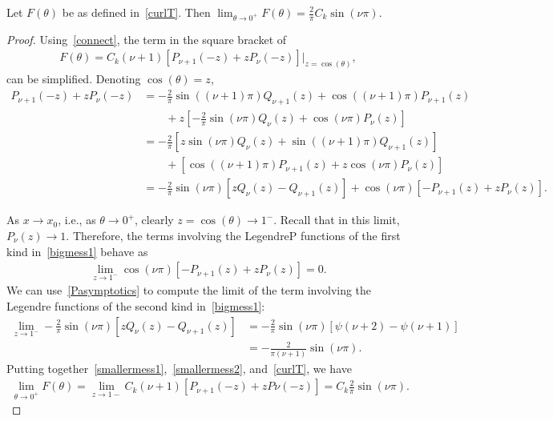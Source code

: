 \documentclass[final]{siamltex}
\newcommand{\C}{C_k}
\begin{document}
\begin{lemma} 
Let $F(\theta)$ be as defined in~\eqref{curlT}. Then
$\lim_{\theta\rightarrow 0^+} F(\theta)= \frac{2}{\pi}C_k \sin(\nu
\pi)$.
\end{lemma}
\begin{proof} 
Using~\eqref{connect}, the term in the square bracket of
\begin{align*}
F(\theta) =  \C (\nu+1)  \left[ P_{\nu+1}(-z) + 
  z P_\nu(-z)\right]\vert_{z=\cos(\theta)},
\end{align*}
can be simplified.  Denoting $\cos(\theta)=z$, 
\begin{align}
  P_{\nu+1}(-z) + z P_\nu(-z)&=-\frac{2}{\pi}\sin\left((\nu+1) \pi\right)Q_{\nu+1}(z)+
    \cos((\nu+1)\pi)P_{\nu+1}(z) \nonumber \\
  & \qquad +z\left[-\frac{2}{\pi}\sin(\nu\pi)Q_\nu\left(z\right)+
    \cos(\nu\pi)P_\nu\left(z\right)  \right] \nonumber \\
  &=-\frac{2}{\pi}\left[z\sin(\nu \pi)Q_\nu\left(z\right) + 
    \sin\left((\nu+1) \pi\right)Q_{\nu+1}\left(z\right)\right]
    \nonumber \\
  & \qquad +\left[ \cos((\nu+1)\pi)P_{\nu+1}\left(z\right) + 
    z\cos(\nu\pi)P_\nu\left(z\right) \right] \nonumber \\
  &=-\frac{2}{\pi}\sin(\nu \pi)\left[ 
    zQ_\nu\left(z\right) - Q_{\nu+1}\left(z\right)\right] 
  + \cos(\nu\pi)\left[
    -P_{\nu+1}\left(z\right)+zP_\nu\left(z\right)\right].
  \label{bigmess1}
\end{align}
 
As $x\rightarrow x_{0}$, i.e., as $\theta \rightarrow 0^{+}$, clearly
$z=\cos(\theta)\rightarrow 1^{-}$. Recall that in this limit, $P_\nu(z)
\rightarrow 1.$ Therefore, the terms involving the LegendreP functions
of the first kind in~\eqref{bigmess1} behave as 
\begin{align} 
  \label{smallermess1}
  \lim_{z \rightarrow 1^- }\cos(\nu\pi)\left[ -P_{\nu+1}(z)+ z P_\nu(z)
  \right]  = 0.
\end{align}
We can use~\eqref{Pasymptotics} to compute the limit of the term involving the Legendre functions of the second kind in~\eqref{bigmess1}:
\begin{align}
  \lim_{z \rightarrow 1^{-}} 
    -\frac{2}{\pi}\sin(\nu\pi)\left[zQ_\nu\left(z\right) - 
    Q_{\nu+1}\left(z\right)\right] 
  &= -\frac{2}{\pi}\sin(\nu\pi)\left[
    \psi(\nu+2)-\psi(\nu+1) \right] \\
  &= -\frac{2}{\pi (\nu+1)}\sin(\nu \pi).
  \label{smallermess2}
\end{align}
Putting together~\eqref{smallermess1},~\eqref{smallermess2},
and~\eqref{curlT}, we have
\begin{align} 
  \label{doublelayerwithz}
\lim_{\theta \rightarrow 0^+}F(\theta)=  \lim_{z\rightarrow 1-}\C(\nu+1)\left[ P_{\nu+1}(-z)+zP{\nu}(-z)\right] =
    \C \frac{2}{\pi} \sin(\nu \pi).
\end{align}

\end{proof}
\end{document}
